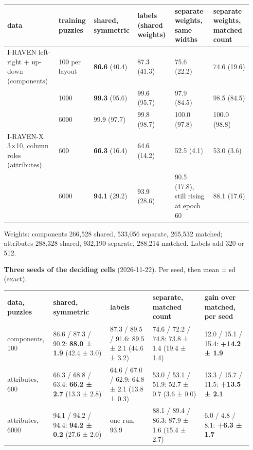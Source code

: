 \begin{center}\small
\begin{tabularx}{\linewidth}{@{}YllYYY@{}}
\toprule
data & training puzzles & shared, symmetric & labels (shared weights) & separate weights, same widths & separate weights, matched count \\
\midrule
I-RAVEN left-right + up-down (components) & 100 per layout & \textbf{86.6} (40.4) & 87.3 (41.3) & 75.6 (22.2) & 74.6 (19.6) \\
 & 1000 & \textbf{99.3} (95.6) & 99.6 (95.7) & 97.9 (84.5) & 98.5 (84.5) \\
 & 6000 & 99.9 (97.7) & 99.8 (98.7) & 100.0 (97.8) & 100.0 (98.8) \\
I-RAVEN-X 3×10, column roles (attributes) & 600 & \textbf{66.3} (16.4) & 64.6 (14.2) & 52.5 (4.1) & 53.0 (3.6) \\
 & 6000 & \textbf{94.1} (29.2) & 93.9 (28.6) & 90.5 (17.8), still rising at epoch 60 & 88.1 (17.6) \\
\bottomrule
\end{tabularx}
\end{center}

Weights: components 266,528 shared, 533,056 separate, 265,532 matched; attributes 288,328 shared, 932,190 separate, 288,214 matched. Labels add 320 or 512.

\textbf{Three seeds of the deciding cells} (2026-11-22). Per seed, then mean ± sd (exact).

\begin{center}\small
\begin{tabularx}{\linewidth}{@{}lYYYY@{}}
\toprule
data, puzzles & shared, symmetric & labels & separate, matched count & gain over matched, per seed \\
\midrule
components, 100 & 86.6 / 87.3 / 90.2: \textbf{88.0 ± 1.9} (42.4 ± 3.0) & 87.3 / 89.5 / 91.6: 89.5 ± 2.1 (44.6 ± 3.2) & 74.6 / 72.2 / 74.8: 73.8 ± 1.4 (19.4 ± 1.4) & 12.0 / 15.1 / 15.4: \textbf{+14.2 ± 1.9} \\
attributes, 600 & 66.3 / 68.8 / 63.4: \textbf{66.2 ± 2.7} (13.3 ± 2.8) & 64.6 / 67.0 / 62.9: 64.8 ± 2.1 (13.8 ± 0.3) & 53.0 / 53.1 / 51.9: 52.7 ± 0.7 (3.6 ± 0.0) & 13.3 / 15.7 / 11.5: \textbf{+13.5 ± 2.1} \\
attributes, 6000 & 94.1 / 94.2 / 94.4: \textbf{94.2 ± 0.2} (27.6 ± 2.0) & one run, 93.9 & 88.1 / 89.4 / 86.3: 87.9 ± 1.6 (15.4 ± 2.7) & 6.0 / 4.8 / 8.1: \textbf{+6.3 ± 1.7} \\
\bottomrule
\end{tabularx}
\end{center}

